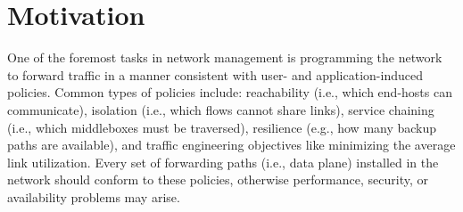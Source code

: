 \section{Motivation} \label{sec:motivation}

One of the foremost tasks in network management is programming the network to
forward traffic in a manner consistent with user- and application-induced
policies. Common types of policies include: reachability (i.e., which
end-hosts can communicate), isolation (i.e., which flows cannot share links),
service chaining (i.e., which middleboxes must be traversed), resilience
(e.g., how many backup paths are available), and traffic engineering 
objectives like minimizing the average link utilization. Every
set of forwarding paths (i.e., data plane) installed in the network
should conform to these 
policies, otherwise performance, security, or availability problems may arise.

